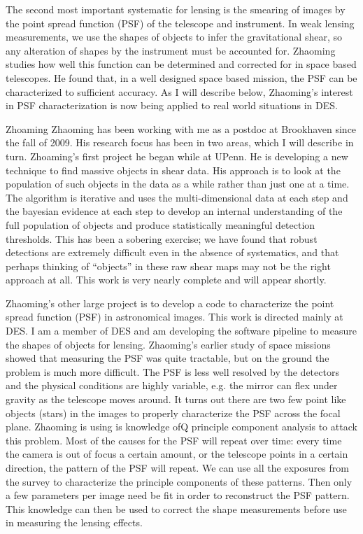 \documentclass[12pt]{letter}
\begin{document}
\begin{letter}{}
The second most important systematic for lensing is the smearing of images by
the point spread function (PSF) of the telescope and instrument.  In weak
lensing measurements, we use the shapes of objects to infer the gravitational
shear, so any alteration of shapes by the instrument must be accounted for.
Zhaoming studies how well this function can be determined and corrected for in
space based telescopes.  He found that, in a well designed space based mission,
the PSF can be characterized to sufficient accuracy.  As I will describe below,
Zhaoming's interest in PSF characterization is now being applied to real world
situations in DES.


Zhoaming Zhaoming has been working with me as a postdoc at Brookhaven since the
fall of 2009.  His research focus has been in two areas, which I will describe
in turn.  Zhoaming's first project he began while at UPenn. He is developing a
new technique to find massive objects in shear data.  His approach is to look
at the population of such objects in the data as a while rather than just one
at a time.  The algorithm is iterative and uses the multi-dimensional data at
each step and the bayesian evidence at each step to develop an internal
understanding of the full population of objects and produce statistically
meaningful detection thresholds.  This has been a sobering exercise; we have
found that robust detections are extremely difficult even in the absence of
systematics, and that perhaps thinking of ``objects'' in these raw shear maps
may not be the right approach at all.  This work is very nearly complete and
will appear shortly.

Zhaoming's other large project is to develop a code to characterize the point
spread function (PSF) in astronomical images.  This work is directed mainly at
DES.  I am a member of DES and am developing the software pipeline to measure
the shapes of objects for lensing.  Zhaoming's earlier study of space missions
showed that measuring the PSF was quite tractable, but on the ground the
problem is much more difficult.  The PSF is less well resolved by the detectors
and the physical conditions are highly variable, e.g. the mirror can flex under
gravity as the telescope moves around.  It turns out there are two few point
like objects (stars) in the images to properly characterize the PSF across the
focal plane.  Zhaoming is using is knowledge ofQ principle component analysis
to attack this problem.  Most of the causes for the PSF will repeat over time:
every time the camera is out of focus a certain amount, or the telescope points
in a certain direction, the pattern of the PSF will repeat. We can use all the
exposures from the survey to characterize the principle components of these
patterns.  Then only a few parameters per image need be fit in order to
reconstruct the PSF pattern.  This knowledge can then be used to correct
the shape measurements before use in measuring the lensing effects.


\end{letter}
\end{document}
